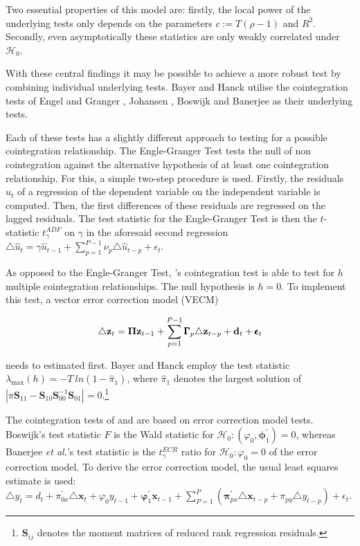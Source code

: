 \documentclass[11pt,a4paper]{article}
\let\rmarkdownfootnote\footnote%
\def\footnote{\protect\rmarkdownfootnote}
\begin{document}
Two essential properties of this model are: firstly, the local power of
the underlying tests only depends on the parameters \(c := T(\rho -1)\)
and \(R^2\). Secondly, even asymptotically these statistics are only
weakly correlated under \(\mathcal{H}_0\). \autocite{gregory_mixed_2004}

With these central findings it may be possible to achieve a more robust
test by combining individual underlying tests. Bayer and Hanck utilise
the cointegration tests of Engel and Granger
\autocite{Englegranger1987}, Johansen \autocite{Johansen1988}, Boswijk
\autocite{Boswijk1994} and Banerjee \autocite{Banerjee1998} as their
underlying tests.

Each of these tests has a slightly different approach to testing for a
possible cointegration relationship. The Engle-Granger Test tests the
null of non cointegration against the alternative hypothesis of at least
one cointegration relationship. For this, a simple two-step procedure is
used. Firstly, the residuals \(\hat{u}_t\) of a regression of the
dependent variable on the independent variable is computed. Then, the
first differences of these residuals are regressed on the lagged
residuals. The test statistic for the Engle-Granger Test is then the
\(t\)-statistic \(t^{ADF}_\gamma\) on \(\gamma\) in the aforesaid second
regression
\(\triangle \hat{u}_t = \gamma \hat{u}_{t-1} + \sum_{p = 1}^{P-1}\nu_p \triangle \hat{u}_{t-p} +\epsilon_t\).
\autocite{Englegranger1987}

As opposed to the Engle-Granger Test, \textcite{Johansen1988}'s
cointegration test is able to test for \(h\) multiple cointegration
relationships. The null hypothesis is \(h = 0\). To implement this test,
a vector error correction model (VECM)

\begin{align}
\triangle {\bf z}_t = {\bf \Pi z}_{t-1} + \sum^{P-1}_{p=1}\pmb{\Gamma}_p \triangle{\bf z}_{t-p} + {\bf d}_t + \pmb{\epsilon}_t
\end{align}

needs to estimated first. Bayer and Hanck employ the test statistic
\(\lambda_{\max} (h) = - T \ ln(1 - \hat{\pi}_1)\), where
\(\hat{\pi}_1\) denotes the largest solution of
\(|\pi \pmb{S}_{11} - \pmb{S}_{10} \pmb{S}_{00}^{-1} \pmb{S}_{01}|= 0\).\footnote{\(\pmb{S}_{ij}\)
  denotes the moment matrices of reduced rank regression residuals.}

The cointegration tests of \textcite{Boswijk1994} and
\textcite{Banerjee1998} are based on error correction model tests.
Boswijk's test statistic \(\hat{F}\) is the Wald statistic for
\(\mathcal{H}_0: (\varphi_0, \pmb{\phi}_1^{'}) = 0\), whereas Banerjee
\emph{et al.}'s test statistic is the \(t_{\gamma}^{ECR}\) ratio for
\(\mathcal{H}_0 : \varphi_0 = 0\) of the error correction model. To
derive the error correction model, the usual least squares estimate is
used:
\(\triangle y_t = d_t + \pi_{0x}^{'} \triangle \pmb{x}_t + \varphi_0 y_{t-1} + \pmb{\varphi}_{1}^{'} \pmb{x}_{t-1} + \sum_{P = 1}^{P} \left( \pmb{\pi}_{px}^{'} \triangle \pmb{x}_{t-p} + \pi_{py} \triangle y_{t - p} \right) + \epsilon_t\).
\end{document}
